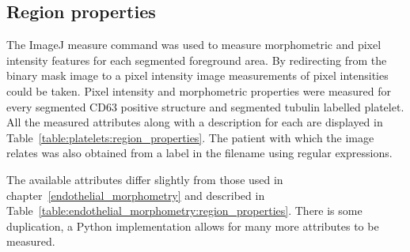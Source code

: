 \subsection{Region properties}
\label{platelets:morphometric_measurements}
The ImageJ measure command was used to measure morphometric and pixel intensity features for each segmented foreground area. By redirecting from the binary mask image to a pixel intensity image measurements of pixel intensities could be taken. Pixel intensity and morphometric properties were measured for every segmented CD63 positive structure and segmented tubulin labelled platelet. All the measured attributes along with a description for each are displayed in Table~\ref{table:platelets:region_properties}. The patient with which the image relates was also obtained from a label in the filename using regular expressions.

The available attributes differ slightly from those used in chapter~\ref{endothelial_morphometry} and described in Table~\ref{table:endothelial_morphometry:region_properties}. There is some duplication, a Python implementation allows for many more attributes to be measured.

